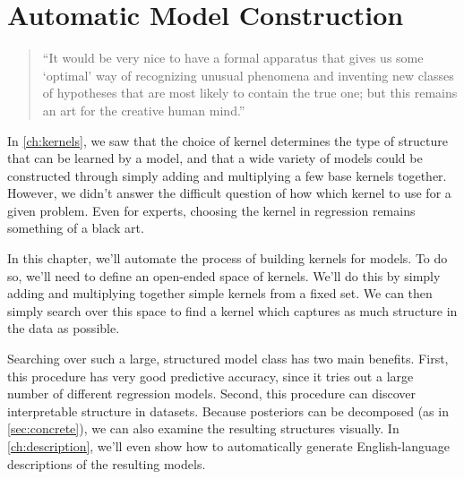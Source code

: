 
\inbpdocument


\chapter{Automatic Model Construction}%
\label{ch:grammar}

\begin{quotation}
``It would be very nice to have a formal apparatus that gives us some `optimal' way of recognizing unusual phenomena and inventing new classes of hypotheses that are most likely to contain the true one; but this remains an art for the creative human mind.''

\hspace*{\fill}
\end{quotation}


In \cref{ch:kernels}, we saw that the choice of kernel determines the type of structure that can be learned by a \gp{} model, and that a wide variety of models could be constructed through simply adding and multiplying a few base kernels together.
However, we didn't answer the difficult question of how which kernel to use for a given problem.
Even for experts, choosing the kernel in \gp{} regression remains something of a black art.

In this chapter, we'll automate the process of building kernels for \gp{} models.
To do so, we'll need to define an open-ended space of kernels.
We'll do this by simply adding and multiplying together simple kernels from a fixed set.
We can then simply search over this space to find a kernel which captures as much structure in the data as possible.

Searching over such a large, structured model class has two main benefits.
First, this procedure has very good predictive accuracy, since it tries out a large number of different regression models.
Second, this procedure can discover interpretable structure in datasets.
Because \gp{} posteriors can be decomposed (as in \cref{sec:concrete}), we can also examine the resulting structures visually.
In \cref{ch:description}, we'll even show how to automatically generate English-language descriptions of the resulting models.

